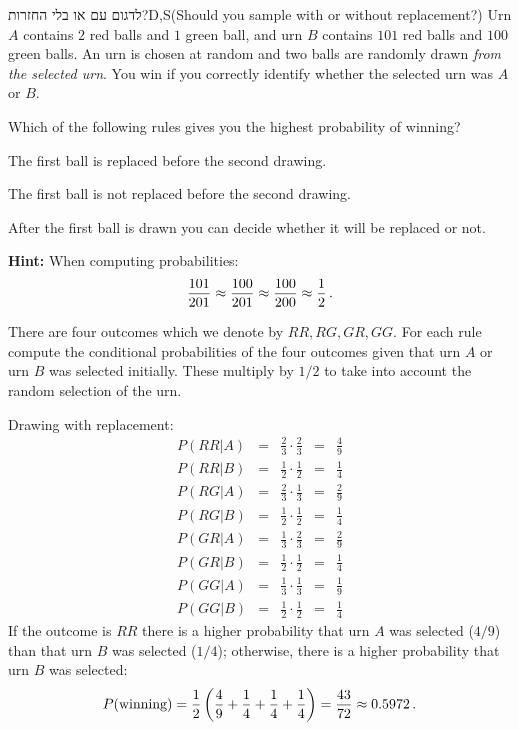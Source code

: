 

\begin{prob}{לדגום עם או בלי החזרות?}{D,S}{(Should you sample with or without replacement?)}
Urn $A$ contains $2$ red balls and $1$ green ball, and urn $B$ contains $101$ red balls and $100$ green balls. An urn is chosen at random and two balls are randomly drawn \emph{from the selected urn}. You win if you correctly identify whether the selected urn was $A$ or $B$.

Which of the following rules gives you the highest probability of winning?

 The first ball is replaced before the second drawing.

 The first ball is not replaced before the second drawing.

 After the first ball is drawn you can decide whether it will be replaced or not.

\textbf{Hint:} When computing probabilities:
\[
\displaystyle\frac{101}{201}\approx \displaystyle\frac{100}{201} \approx \displaystyle\frac{100}{200} \approx \displaystyle\frac{1}{2}\,.
\]
\end{prob}

\vspace{-5ex}

\solution{}

There are four outcomes which we denote by $RR, RG, GR, GG$. For each rule compute the conditional probabilities of the four outcomes given that urn $A$ or urn $B$ was selected initially. These multiply by $1/2$ to take into account the random selection of the urn.

 Drawing with replacement:
\[
\renewcommand*{\arraystretch}{1.5}
\begin{array}{lcccc}
P(RR|A) &=& \frac{2}{3} \cdot \frac{2}{3} &=& \frac{4}{9}\\
P(RR|B) &=& \frac{1}{2} \cdot \frac{1}{2} &=& \frac{1}{4}\\
\hline
P(RG|A) &=& \frac{2}{3} \cdot \frac{1}{3} &=& \frac{2}{9}\\
P(RG|B) &=& \frac{1}{2} \cdot \frac{1}{2} &=& \frac{1}{4}\\
\hline
P(GR|A) &=& \frac{1}{3} \cdot \frac{2}{3} &=& \frac{2}{9}\\
P(GR|B) &=& \frac{1}{2} \cdot \frac{1}{2} &=& \frac{1}{4}\\
\hline
P(GG|A) &=& \frac{1}{3} \cdot \frac{1}{3} &=& \frac{1}{9}\\
P(GG|B) &=& \frac{1}{2} \cdot \frac{1}{2} &=& \frac{1}{4}\end{array}
\]
If the outcome is $RR$ there is a higher probability that urn $A$ was selected ($4/9$) than that urn $B$ was selected ($1/4$); otherwise, there is a higher probability that urn $B$ was selected:
\[
P(\textrm{winning})=\frac{1}{2}\left(\frac{4}{9} + \frac{1}{4}+ \frac{1}{4}+ \frac{1}{4}\right)=\displaystyle\frac{43}{72}\approx 0.5972\,.
\]

